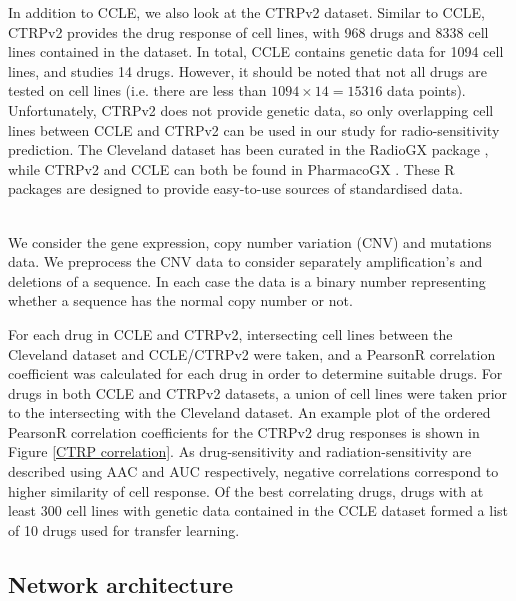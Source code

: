 \documentclass[NOTE, disdraft=true, UKenglish]{\DISCDTLATEXPATH UCLCDTDISdoc}
\begin{document}
In addition to CCLE, we also look at the CTRPv2 \cite{CTRP} dataset. Similar to CCLE, CTRPv2 provides the drug response of cell lines, with 968 drugs and 8338 cell lines contained in the dataset. In total, CCLE contains genetic data for 1094 cell lines, and studies 14 drugs. However, it should be noted that not all drugs are tested on cell lines (i.e. there are less than $1094\times14 = 15316$ data points). Unfortunately, CTRPv2 does not provide genetic data, so only overlapping cell lines between CCLE and CTRPv2 can be used in our study for radio-sensitivity prediction. The Cleveland dataset has been curated in the RadioGX package \cite{manem}, while CTRPv2 and CCLE can both be found in PharmacoGX \cite{pharmaco}. These R packages are designed to provide easy-to-use sources of standardised data.

\\ \indent We consider the gene expression, copy number variation (CNV) and mutations data. We preprocess the CNV data to consider separately amplification's and deletions of a sequence. In each case the data is a binary number representing whether a sequence has the normal copy number or not.

For each drug in CCLE and CTRPv2, intersecting cell lines between the Cleveland dataset and CCLE/CTRPv2 were taken, and a PearsonR correlation coefficient was calculated for each drug in order to determine suitable drugs. For drugs in both CCLE and CTRPv2 datasets, a union of cell lines were taken prior to the intersecting with the Cleveland dataset. An example plot of the ordered PearsonR correlation coefficients for the CTRPv2 drug responses is shown in Figure \ref{CTRP correlation}. As drug-sensitivity and radiation-sensitivity are described using AAC and AUC respectively, negative correlations correspond to higher similarity of cell response. Of the best correlating drugs, drugs with at least 300 cell lines with genetic data contained in the CCLE dataset formed a list of 10 drugs used for transfer learning.




\subsection{Network architecture}
\end{document}
